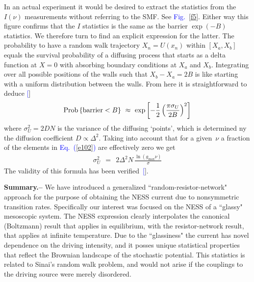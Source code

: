 \documentclass[aps,prl,floats,floatfix,twocolumn]{revtex4}
\newcommand{\mylabel}[1]{\label{#1}}
\newcommand{\beq}{\begin{eqnarray}}
\newcommand{\eeq}{\end{eqnarray}}
\newcommand{\be}[1]{\begin{eqnarray}\ifthenelse{#1=-1}
{\nonumber}{\ifthenelse{#1=0}{}{\mylabel{e#1}}}}
\newcommand{\sect}[1]{{\bf #1.-- }}
\newcommand{\Eq}[1]{\textcolor{blue}{Eq.\!\!~(\ref{#1})}}
\newcommand{\Fig}[1]{\textcolor{blue}{Fig.}\!\!~\ref{#1}}
\renewcommand{\cite}[1]{\textcolor{blue}{[\onlinecite{#1}}]} %
\begin{document}
In an actual experiment it would be desired to 
extract the statistics from the $I(\nu)$ measurements 
without referring to the SMF. See \Fig{f5}.
Either way this figure confirms that the $I$ statistics
is the same as the barrier ${\exp(-B)}$ statistics. 
We therefore turn to find an explicit expression for the latter. 
%
%
The probability to have a random walk trajectory $X_n=U(x_n)$ within $[X_a,X_b]$ 
equals the survival probability of a diffusing process  
that starts as a delta function at ${X=0}$ 
with absorbing boundary conditions at $X_a$ and $X_b$.   
Integrating over all possible positions of the walls 
such that ${X_b-X_a=2B}$ is like starting with a 
uniform distribution between the walls. From here 
it is straightforward to deduce \cite{SM}
%
\be{20}
\text{Prob}\left\{\text{barrier}<B\right\} \ \approx \ \exp\left[-\frac{1}{2} \left(\frac{\pi \sigma_U}{2B}\right)^2\right] 
\eeq
%
where $\sigma_U^2 = 2D N$ is the variance of the diffusing `points', 
which is determined ny the diffusion coefficient $D\propto \Delta^2$.
Taking into account that for a given~$\nu$ a fraction of the elements
in \Eq{e102} are effectively zero we get 
%
\beq
\sigma_U^2 \ \ = \ \ 2 \Delta^2 N  \, \frac{\ln(g_{\text{max}}\nu)}{\sigma}
\eeq  
%  
The validity of this formula has been verified~\cite{SM}.

\sect{Summary}
%
%
We have introduced a generalized ``random-resistor-network"
approach for the purpose of obtaining the NESS current
due to nonsymmetric transition rates. Specifically our 
interest was focused on the NESS of a ``glassy" mesoscopic system. 
The NESS expression clearly interpolates the canonical (Boltzmann) result 
that applies in equilibrium, with the resistor-network result, 
that applies at infinite temperature. 
Due to the ``glassiness" the current has novel dependence 
on the driving intensity, and it posses unique statistical properties 
that reflect the Brownian landscape of the stochastic potential.
This statistics is related to Sinai's random walk problem, 
and would not arise if the couplings to the driving source 
were merely disordered.


\clearpage
\end{document}

